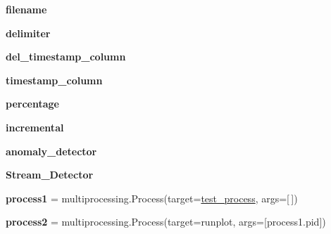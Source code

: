 \begin{DoxyCompactItemize}
\item 
{\bfseries filename}\hypertarget{namespaceSAD_1_1Main__Timestamp_aeab2940872abe7384f2ad3c5b10d4ad3}{}\label{namespaceSAD_1_1Main__Timestamp_aeab2940872abe7384f2ad3c5b10d4ad3}

\item 
{\bfseries delimiter}\hypertarget{namespaceSAD_1_1Main__Timestamp_a8adc97d3b73c2ff5f052d93f8fac3c94}{}\label{namespaceSAD_1_1Main__Timestamp_a8adc97d3b73c2ff5f052d93f8fac3c94}

\item 
{\bfseries del\+\_\+timestamp\+\_\+column}\hypertarget{namespaceSAD_1_1Main__Timestamp_a1fb08d1a77dbc5b6ae30e9119e754cba}{}\label{namespaceSAD_1_1Main__Timestamp_a1fb08d1a77dbc5b6ae30e9119e754cba}

\item 
{\bfseries timestamp\+\_\+column}\hypertarget{namespaceSAD_1_1Main__Timestamp_a67c5f08df7722fba790bca90a4e30b81}{}\label{namespaceSAD_1_1Main__Timestamp_a67c5f08df7722fba790bca90a4e30b81}

\item 
{\bfseries percentage}\hypertarget{namespaceSAD_1_1Main__Timestamp_a83c2dd92de32c79f02c8beb41c8a26f5}{}\label{namespaceSAD_1_1Main__Timestamp_a83c2dd92de32c79f02c8beb41c8a26f5}

\item 
{\bfseries incremental}\hypertarget{namespaceSAD_1_1Main__Timestamp_a7b85d8847f4314025a103bafd005c2ea}{}\label{namespaceSAD_1_1Main__Timestamp_a7b85d8847f4314025a103bafd005c2ea}

\item 
{\bfseries anomaly\+\_\+detector}
\item 
{\bfseries Stream\+\_\+\+Detector}
\item 
{\bfseries process1} = multiprocessing.\+Process(target=\hyperlink{namespaceSAD_1_1Main__Timestamp_a8238248c631be66c271ea6a591b587b4}{test\+\_\+process}, args=\mbox{[}$\,$\mbox{]})\hypertarget{namespaceSAD_1_1Main__Timestamp_a4cf9f3766f386686284f085ec3b1bec7}{}\label{namespaceSAD_1_1Main__Timestamp_a4cf9f3766f386686284f085ec3b1bec7}

\item 
{\bfseries process2} = multiprocessing.\+Process(target=runplot, args=\mbox{[}process1.\+pid\mbox{]})\hypertarget{namespaceSAD_1_1Main__Timestamp_a051640a544c35634b30f6f7c3d08a6bb}{}\label{namespaceSAD_1_1Main__Timestamp_a051640a544c35634b30f6f7c3d08a6bb}

\end{DoxyCompactItemize}


